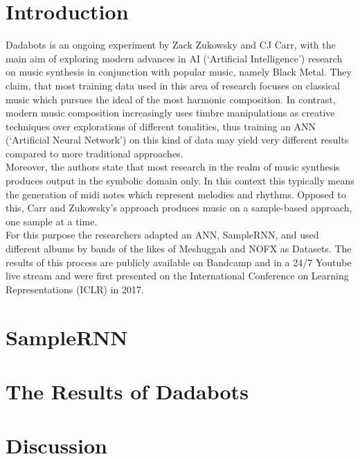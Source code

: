 \documentclass[a4paper, 11pt]{report}
\begin{document}
\chapter{Introduction}
Dadabots is an ongoing experiment by Zack Zukowsky and CJ Carr, with the main 
aim of exploring modern advances in AI (‘Artificial Intelligence’) research on 
music synthesis in conjunction with popular music, namely Black Metal. They 
claim, that most training data used in this area of research focuses on 
classical music which pursues the ideal of the most harmonic composition. 
In contrast, modern music composition increasingly uses timbre manipulations as 
creative techniques over explorations of different 
tonalities\cite{zukowski2018generating}, thus training an 
ANN (‘Artificial Neural Network’) on this kind of data may yield very different 
results compared to more traditional approaches. \\
Moreover, the authors state that most research in the realm of music synthesis 
produces output in the symbolic domain only\cite{zukowski2018generating}. In this context this typically means 
the generation of midi notes which represent melodies and rhythms. Opposed to 
this, Carr and Zukowsky’s approach produces music on a sample-based approach, 
one sample at a time\cite{mehri2016samplernn}\cite{zukowski2018generating}.  \\
For this purpose the researchers adapted an ANN, SampleRNN, and used different 
albums by bands of the likes of Meshuggah and NOFX as Datasets. The results of 
this process are publicly available on Bandcamp and in a 24/7 Youtube live 
stream and were first presented on the International Conference on Learning 
Representations (ICLR) in 2017. 

\chapter{SampleRNN}

\chapter{The Results of Dadabots}


\chapter{Discussion}




\end{document}

